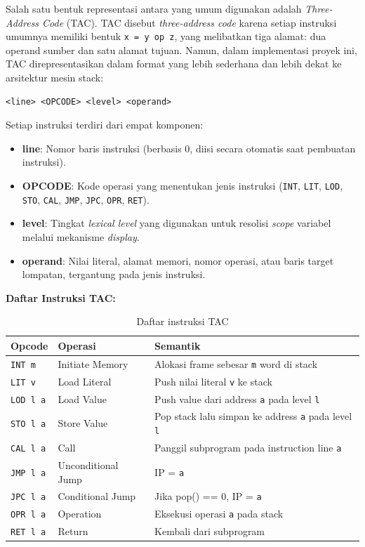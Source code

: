 \documentclass[12pt,a4paper]{article}
\begin{document}
Salah satu bentuk representasi antara yang umum digunakan adalah
\textit{Three-Address Code} (TAC). TAC disebut \textit{three-address code}
karena setiap instruksi umumnya memiliki bentuk \texttt{x = y op z}, yang
melibatkan tiga alamat: dua operand sumber dan satu alamat tujuan. Namun,
dalam implementasi proyek ini, TAC direpresentasikan dalam format yang lebih
sederhana dan lebih dekat ke arsitektur mesin stack:

\begin{verbatim}
<line> <OPCODE> <level> <operand>
\end{verbatim}

Setiap instruksi terdiri dari empat komponen:
\begin{itemize}
    \item \textbf{line}: Nomor baris instruksi (berbasis 0, diisi secara
        otomatis saat pembuatan instruksi).
    \item \textbf{OPCODE}: Kode operasi yang menentukan jenis instruksi
        (\texttt{INT}, \texttt{LIT}, \texttt{LOD}, \texttt{STO}, \texttt{CAL},
        \texttt{JMP}, \texttt{JPC}, \texttt{OPR}, \texttt{RET}).
    \item \textbf{level}: Tingkat \textit{lexical level} yang digunakan untuk
        resolisi \textit{scope} variabel melalui mekanisme \textit{display}.
    \item \textbf{operand}: Nilai literal, alamat memori, nomor operasi, atau
        baris target lompatan, tergantung pada jenis instruksi.
\end{itemize}

\textbf{Daftar Instruksi TAC:}

\begin{table}[H]
\centering
\caption{Daftar instruksi TAC}
\begin{tabular}{llp{8cm}}
\toprule
\textbf{Opcode} & \textbf{Operasi} & \textbf{Semantik} \\
\midrule
\texttt{INT m} & Initiate Memory & Alokasi frame sebesar \texttt{m} word di stack \\
\texttt{LIT v} & Load Literal & Push nilai literal \texttt{v} ke stack \\
\texttt{LOD l a} & Load Value & Push value dari address \texttt{a} pada level \texttt{l} \\
\texttt{STO l a} & Store Value & Pop stack lalu simpan ke address \texttt{a} pada level \texttt{l} \\
\texttt{CAL l a} & Call & Panggil subprogram pada instruction line \texttt{a} \\
\texttt{JMP l a} & Unconditional Jump & IP = \texttt{a} \\
\texttt{JPC l a} & Conditional Jump & Jika pop() == 0, IP = \texttt{a} \\
\texttt{OPR l a} & Operation & Eksekusi operasi \texttt{a} pada stack \\
\texttt{RET l a} & Return & Kembali dari subprogram \\
\bottomrule
\end{tabular}
\end{table}
\end{document}

